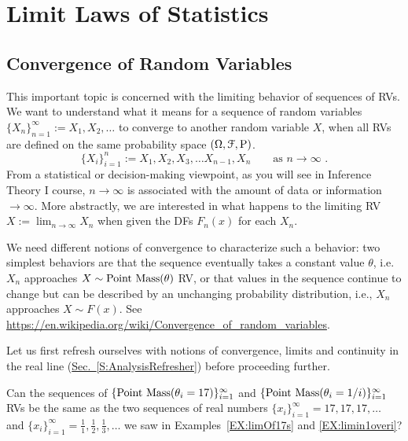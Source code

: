 

\chapter{Limit Laws of Statistics}\label{S:LimitLawsStats}

\section{Convergence of Random Variables}\label{S:ConvOfRVs}

This important topic is concerned with the limiting behavior of sequences of RVs. 
We want to understand what it means for a sequence of random variables $\{X_n\}_{n=1}^{\infty} := X_1,X_2,\ldots$ to converge to another random variable $X$, when all RVs are defined on the same probability space $(\Omega,\mathcal{F},\P)$.
\[
\{X_i \}_{i=1}^n := X_1,X_2,X_3, \ldots X_{n-1}, X_n \qquad \text{as  $n \rightarrow \infty$ .}
\]
From a statistical or decision-making viewpoint, as you will see in Inference Theory I course, $n \rightarrow \infty$ is associated with the amount of data or information $\rightarrow \infty$.  
More abstractly, we are interested in what happens to the limiting RV $X := \lim_{n\to \infty} X_n$ when given the DFs $F_n(x)$ for each $X_n$. 

We need different notions of convergence to characterize such a behavior: two simplest behaviors are that the sequence eventually takes a constant value $\theta$, 
i.e. $X_n$ approaches $X \sim \pointmass(\theta)$ RV, or that values in the sequence continue to change but can be described by an unchanging probability distribution, i.e., $X_n$ approaches $X \sim F(x)$. See \url{https://en.wikipedia.org/wiki/Convergence_of_random_variables}.

Let us first refresh ourselves with notions of convergence, limits and continuity in the real line (\hyperref[S:AnalysisRefresher]{Sec.~\ref*{S:AnalysisRefresher}}) before proceeding further.

Can the sequences of $\{\pointmass(\theta_i=17)\}_{i=1}^{\infty}$ and $\{\pointmass(\theta_i=1/i)\}_{i=1}^{\infty}$ RVs be the same as the two sequences of real numbers $\{ x_i \}_{i=1}^{\infty} = 17, 17, 17, \ldots$ and $\{ x_i \}_{i=1}^{\infty} = \frac{1}{1},\frac{1}{2},\frac{1}{3}, \ldots$ we saw in Examples~\ref{EX:limOf17s} and \ref{EX:limin1overi}?


